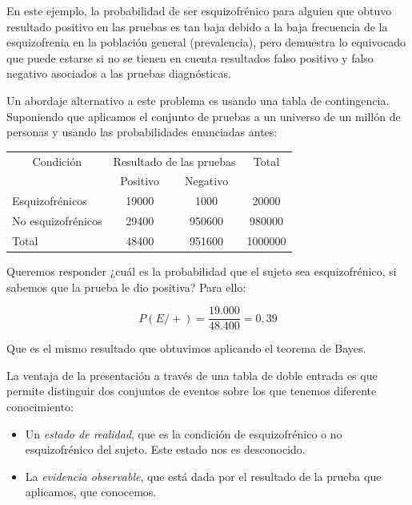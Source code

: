 \documentclass[]{book}
\begin{document}
En este ejemplo, la probabilidad de ser esquizofrénico para alguien que
obtuvo resultado positivo en las pruebas es tan baja debido a la baja
frecuencia de la esquizofrenia en la población general (prevalencia),
pero demuestra lo equivocado que puede estarse si no se tienen en cuenta
resultados falso positivo y falso negativo asociados a las pruebas
diagnósticas.

Un abordaje alternativo a este problema es usando una tabla de
contingencia. Suponiendo que aplicamos el conjunto de pruebas a un
universo de un millón de personas y usando las probabilidades enunciadas
antes:

\begin{table}[H]
\centering
\begin{tabular}{lccc}
\toprule
\multicolumn{1}{c}{Condición} & \multicolumn{2}{c}{Resultado de las pruebas} & \multicolumn{1}{c}{Total} \\
\cmidrule(l{3pt}r{3pt}){1-1} \cmidrule(l{3pt}r{3pt}){2-3} \cmidrule(l{3pt}r{3pt}){4-4}
 & Positivo & Negativo & \\
\midrule
\rowcolor{gray!6}  Esquizofrénicos & 19000 & 1000 & 20000\\
No esquizofrénicos & 29400 & 950600 & 980000\\
\rowcolor{gray!6}  Total & 48400 & 951600 & 1000000\\
\bottomrule
\end{tabular}
\end{table}

Queremos responder ¿cuál es la probabilidad que el sujeto sea
esquizofrénico, si sabemos que la prueba le dio positiva? Para ello:

\[P(E/+) = \frac{19.000}{48.400} = 0,39\]

Que es el mismo resultado que obtuvimos aplicando el teorema de Bayes.

La ventaja de la presentación a través de una tabla de doble entrada es
que permite distinguir dos conjuntos de eventos sobre los que tenemos
diferente conocimiento:

\begin{itemize}
\item
  Un \emph{estado de realidad}, que es la condición de esquizofrénico o no esquizofrénico del sujeto. Este estado nos es desconocido.
\item
  La \emph{evidencia observable}, que está dada por el resultado de la prueba que aplicamos, que conocemos.
\end{itemize}
\end{document}
